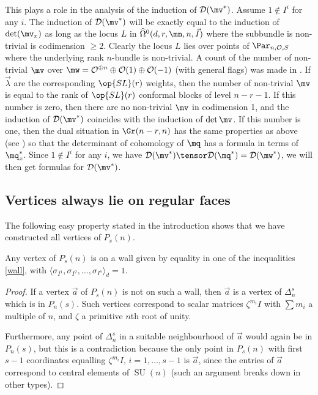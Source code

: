 This plays a role in the analysis of the induction of $\mathcal{D}(\mv^*)$. Assume $1\not\in I^i$ for any $i$. The induction of $\mathcal{D}(\mv^*)$ will be exactly equal to the induction of $\det(\mv_x)$ as long as the locus $L$  in $\widehat{\Omega}^0(d,r,\mn,n,\vec{I})$ where the subbundle is non-trivial is codimension $\geq 2$. Clearly the locus $L$ lies over points of ${\Par}_{n,\mathcal{O},S}$
 where the underlying rank $n$-bundle is non-trivial. A count of the number of non-trivial $\mv$ over $\mw=\mathcal{O}^{\oplus n}\oplus \mathcal{O}(1)\oplus\mathcal{O}(-1)$ (with general flags) was made in \cite[Section 9.6]{BGM}. If $\vec{\lambda}$ are the corresponding $\op{SL}(r)$ weights, then the number of non-trivial $\mv$ is equal to the rank of $\op{SL}(r)$ conformal blocks of level  $n-r-1$. If this number is zero, then there are no non-trivial
 $\mv$ in codimension 1, and the induction of $\mathcal{D}(\mv^*)$ coincides with the induction of $\det\mv$. If this number is one, then the dual situation in $\Gr(n-r,n)$ has the same properties as above (see \cite[Prop 1.1]{BGM}) so that the determinant of cohomology of $\mq$ has a formula in terms of $\mq_x^*$. Since $1\not\in I^i$ for any $i$, we have $\mathcal{D}(\mv^*) \tensor \mathcal{D}(\mq^*)= \mathcal{D}(\mw^*)$, we will then get formulas for $\mathcal{D}(\mv^*)$.



\subsection{Vertices always lie on regular faces}
The following easy property stated in the introduction shows that we have constructed all vertices of
$P_s(n)$.
\begin{lemma}
\notready\label{pinky}
Any vertex of $P_{s}(n)$ is on a wall given by equality in one of the inequalities \eqref{wall}, with
$\langle\sigma_{I^1}, \sigma_{I^2},\dots,\sigma_{I^s}\rangle_d= 1$.
\end{lemma}
\begin{proof}
If a vertex $\vec{a}$ of $P_{s}(n)$ is not on such a wall, then $\vec{a}$ is a vertex of $\Delta_n^s$ which is in $P_{n}(s)$. Such vertices correspond to scalar matrices $\zeta^{m_i}I$ with $\sum m_i$ a multiple of $n$, and $\zeta$ a primitive $n$th root of unity.

Furthermore, any point of $\Delta_n^s$ in a suitable neighbourhood of $\vec{a}$ would again be in $P_n(s)$, but this is a contradiction because the only point in $P_{s}(n)$  with first $s-1$ coordinates equalling $\zeta^{m_i}I$, $i=1,\dots,s-1$ is $\vec{a}$, since the entries of $\vec{a}$ correspond to central elements of $\operatorname{SU}(n)$ (such an argument breaks down in other types).
\end{proof}
